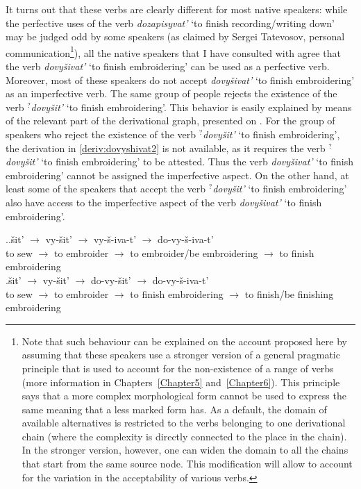 It turns out that these verbs are clearly different for most native speakers: while the perfective uses of the verb \textit{dozapisyvat'} `to finish recording/writing down' may be judged odd by some speakers (as claimed by Sergei Tatevosov, personal communication\footnote{Note that such behaviour can be explained on the account proposed here by assuming that these speakers use a stronger version of a general pragmatic principle that is used to account for the non-existence of a range of verbs (more information in Chapters~\ref{Chapter5} and~\ref{Chapter6}). This principle says that a more complex morphological form cannot be used to express the same meaning that a less marked form has. As a default, the domain of available alternatives is restricted to the verbs belonging to one derivational chain (where the complexity is directly connected to the place in the chain). In the stronger version, however, one can widen the domain to all the chains that start from the same source node. This modification will allow to account for the variation in the acceptability of various verbs.}), all the native speakers that I have consulted with agree that the verb \textit{dovy\v{s}ivat'} `to finish embroidering' can be used as a perfective verb. Moreover, most of these speakers do not accept \textit{dovy\v{s}ivat'} `to finish embroidering' as an imperfective verb. The same group of people rejects the existence of the verb $^?$\textit{dovy\v{s}it'}\textsuperscript{\PF} `to finish embroidering'. This behavior is easily explained by means of the relevant part of the derivational graph, presented on . For the group of speakers who reject the existence of the verb $^?$\textit{dovy\v{s}it'}\textsuperscript{\PF} `to finish embroidering', the derivation in \ref{deriv:dovyshivat2} is not available, as it requires the verb $^?$\textit{dovy\v{s}it'}\textsuperscript{\PF} `to finish embroidering' to be attested. Thus the verb \textit{dovy\v{s}ivat'} `to finish embroidering' cannot be assigned the imperfective aspect. On the other hand, at least some of the speakers that accept the verb $^?$\textit{dovy\v{s}it'}\textsuperscript{\PF} `to finish embroidering' also have access to the imperfective aspect of the verb \textit{dovy\v{s}ivat'} `to finish embroidering'.

\ex.\label{deriv:dovyshivat}\ag.\label{deriv:dovyshivat1}\v{s}it'\textsuperscript{\IPF} $\rightarrow$ vy-\v{s}it'\textsuperscript{\PF} $\rightarrow$ vy-\v{s}-iva-t'\textsuperscript{\IPF} $\rightarrow$ do-vy-\v{s}-iva-t'\textsuperscript{\PF}\\
{to sew} $\rightarrow$ {to embroider} $\rightarrow$ {to embroider/be embroidering} $\rightarrow$ {to finish embroidering}\\
\bg.\label{deriv:dovyshivat2}\v{s}it'\textsuperscript{\IPF} $\rightarrow$ vy-\v{s}it'\textsuperscript{\PF} $\rightarrow$ do-vy-\v{s}it'\textsuperscript{\PF} $\rightarrow$ do-vy-\v{s}-iva-t'\textsuperscript{\IPF}\\
{to sew} $\rightarrow$ {to embroider} $\rightarrow$ {to finish embroidering} $\rightarrow$ {to finish/be finishing embroidering}\\

